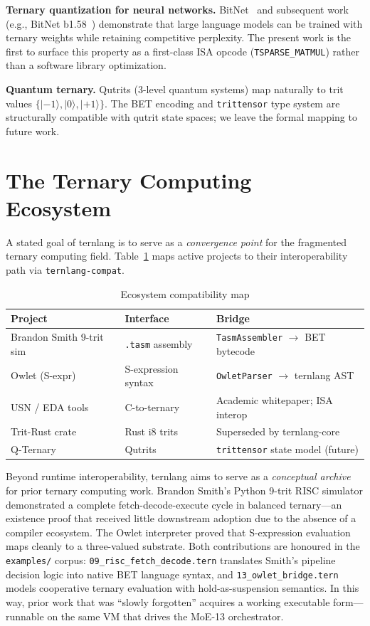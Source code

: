 \documentclass[journal,10pt,twocolumn]{IEEEtran}
\begin{document}
\textbf{Ternary quantization for neural networks.} BitNet~\cite{ma2024era}
and subsequent work (e.g., BitNet b1.58~\cite{ma2024bitnet158}) demonstrate
that large language models can be trained with ternary weights while retaining
competitive perplexity. The present work is the first to surface this property
as a first-class ISA opcode (\texttt{TSPARSE\_MATMUL}) rather than a software
library optimization.

\textbf{Quantum ternary.} Qutrits (3-level quantum systems) map naturally to
trit values $\{|{-1}\rangle, |0\rangle, |{+1}\rangle\}$. The BET encoding and
\texttt{trittensor} type system are structurally compatible with qutrit state
spaces; we leave the formal mapping to future work.

\section{The Ternary Computing Ecosystem}
\label{sec:ecosystem}

A stated goal of ternlang is to serve as a \emph{convergence point} for the
fragmented ternary computing field. Table~\ref{tab:ecosystem} maps active
projects to their interoperability path via \texttt{ternlang-compat}.

\begin{table}[h]
\centering
\small
\caption{Ecosystem compatibility map}
\label{tab:ecosystem}
\begin{tabular}{p{2.2cm}p{2.2cm}p{2.8cm}}
\toprule
Project & Interface & Bridge \\
\midrule
Brandon Smith 9-trit sim & \texttt{.tasm} assembly & \texttt{TasmAssembler} $\to$ BET bytecode \\
Owlet (S-expr) & S-expression syntax & \texttt{OwletParser} $\to$ ternlang AST \\
USN / EDA tools & C-to-ternary & Academic whitepaper; ISA interop \\
Trit-Rust crate & Rust i8 trits & Superseded by ternlang-core \\
Q-Ternary & Qutrits & \texttt{trittensor} state model (future) \\
\bottomrule
\end{tabular}
\end{table}

Beyond runtime interoperability, ternlang aims to serve as a
\emph{conceptual archive} for prior ternary computing work.
Brandon Smith's Python 9-trit RISC simulator demonstrated a complete
fetch-decode-execute cycle in balanced ternary—an existence proof that
received little downstream adoption due to the absence of a compiler
ecosystem. The Owlet interpreter proved that S-expression evaluation maps
cleanly to a three-valued substrate. Both contributions are honoured in
the \texttt{examples/} corpus: \texttt{09\_risc\_fetch\_decode.tern}
translates Smith's pipeline decision logic into native BET language syntax,
and \texttt{13\_owlet\_bridge.tern} models cooperative ternary evaluation
with hold-as-suspension semantics. In this way, prior work that was
``slowly forgotten'' acquires a working executable form—runnable on the
same VM that drives the MoE-13 orchestrator.
\end{document}
